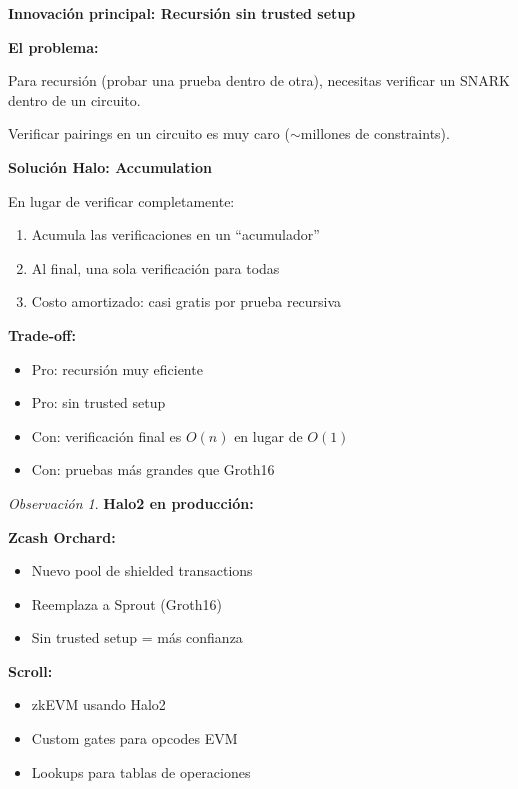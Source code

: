 \documentclass[11pt,a4paper,twoside,openright]{book}
\theoremstyle{definition}
\theoremstyle{plain}
\theoremstyle{remark}
\newtheorem{remark}{Observación}[chapter]
\begin{document}
\begin{keyidea}
\textbf{Innovación principal: Recursión sin trusted setup}

\textbf{El problema:}

Para recursión (probar una prueba dentro de otra), necesitas verificar un SNARK dentro de un circuito.

Verificar pairings en un circuito es muy caro ($\sim$millones de constraints).

\textbf{Solución Halo: Accumulation}

En lugar de verificar completamente:
\begin{enumerate}
    \item Acumula las verificaciones en un ``acumulador''
    \item Al final, una sola verificación para todas
    \item Costo amortizado: casi gratis por prueba recursiva
\end{enumerate}

\textbf{Trade-off:}
\begin{itemize}
    \item Pro: recursión muy eficiente
    \item Pro: sin trusted setup
    \item Con: verificación final es $O(n)$ en lugar de $O(1)$
    \item Con: pruebas más grandes que Groth16
\end{itemize}
\end{keyidea}

\begin{remark}
\textbf{Halo2 en producción:}

\textbf{Zcash Orchard:}
\begin{itemize}
    \item Nuevo pool de shielded transactions
    \item Reemplaza a Sprout (Groth16)
    \item Sin trusted setup = más confianza
\end{itemize}

\textbf{Scroll:}
\begin{itemize}
    \item zkEVM usando Halo2
    \item Custom gates para opcodes EVM
    \item Lookups para tablas de operaciones
\end{itemize}
\end{remark}
\end{document}
